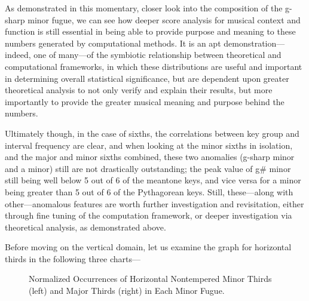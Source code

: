     \begin{center}
    \end{center}
    
    As demonstrated in this momentary, closer look into the composition of
the g-sharp minor fugue, we can see how deeper score analysis for
musical context and function is still essential in being able to provide
purpose and meaning to these numbers generated by computational methods.
It is an apt demonstration---indeed, one of many---of the
symbiotic relationship between theoretical and computational frameworks,
in which these distributions are useful and important in determining
overall statistical significance, but are dependent upon greater
theoretical analysis to not only verify and explain their results, but
more importantly to provide the greater musical meaning and purpose
behind the numbers.

Ultimately though, in the case of sixths, the correlations between key
group and interval frequency are clear, and when looking at the minor
sixths in isolation, and the major and minor sixths combined, these two
anomalies (g-sharp minor and a minor) still are not drastically
outstanding; the peak value of g\# minor still being well below 5 out of
6 of the meantone keys, and vice versa for a minor being greater than 5
out of 6 of the Pythagorean keys. Still, these---along with
other---anomalous features are worth further investigation and
revisitation, either through fine tuning of the computation framework,
or deeper investigation via theoretical analysis, as demonstrated above.

Before moving on the vertical domain, let us examine the graph for
horizontal thirds in the following three charts---



\begin{figure}[H]
\vspace{1.5em}
    \centering
    \caption[Normalized Occurrences of Horizontal Nontempered Minor and Thirds in Each Minor Fugue. ]{Normalized Occurrences of Horizontal Nontempered Minor Thirds (left) and Major Thirds (right) in Each Minor Fugue.}
\end{figure}


